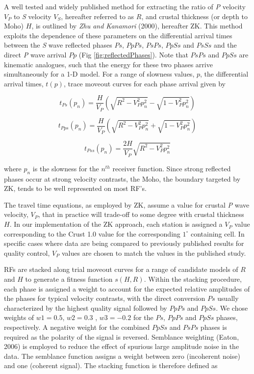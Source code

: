 \documentclass[msc,oneside]{ubcthesis}
\begin{document}
A well tested and widely published method for extracting the ratio of {\it P} velocity $V_P$ to {\it S} velocity $V_S$, hereafter referred to as $R$, and crustal thickness (or depth to Moho) $H$, is outlined by {\it Zhu and Kanamori} (2000), hereafter ZK. This method exploits the dependence of these parameters on the differential arrival times between the {\it S} wave reflected phases $Ps$, $PpPs$, $PsPs$, $PpSs$ and $PsSs$ and the direct {\it P} wave arrival $Pp$ (Fig \ref{fig:reflectedPhases}). Note that $PsPs$ and $PpSs$ are kinematic analogues, such that the energy for these two phases arrive simultaneously for a 1-D model. For a range of slowness values, $p$, the differential arrival times, $t(p)$, trace moveout curves for each phase arrival given by

\begin{equation} \label{eq:tps}
t_{Ps}(p_n) = \frac{H}{V_P} \left( \sqrt{ R^2 - V_P^2p_n^2} - \sqrt{1 - V_P^2p_n^2} \right)
\end{equation}

\begin{equation} \label{eq:tpps}
t_{Pps}(p_n) = \frac{H}{V_P} \left( \sqrt{ R^2 - V_P^2p_n^2} + \sqrt{1 - V_P^2p_n^2} \right)
\end{equation}

\begin{equation} \label{eq:tpss}
t_{Pss}(p_n)= \frac{2H}{V_P} \sqrt{ R^2 - V_P^2p_n^2}
\end{equation}

\noindent where $p_n$ is the slowness for the $n^{th}$ receiver function. Since strong reflected phases occur at strong velocity contrasts, the Moho, the boundary targeted by ZK, tends to be well represented on most RF's.

The travel time equations, as employed by ZK, assume a value for crustal {\it P} wave velocity, $V_P$, that in practice will trade-off to some degree with crustal thickness $H$. In our implementation of the ZK approach, each station is assigned a $V_P$ value corresponding to the Crust 1.0 value for the corresponding $1^\circ$ containing cell. In specific cases where data are being compared to previously published results for quality control, $V_P$  values are chosen to match the values in the published study.

RFs are stacked along trial moveout curves for a range of candidate models of $R$ and $H$ to generate a fitness function $s(H,R)$.  Within the stacking procedure, each phase is assigned a weight to account for the expected relative amplitudes of the phases for typical velocity contrasts, with the direct conversion $Ps$ usually characterized by the highest quality signal followed by $PpPs$ and $PpSs$. We chose weights of $w1 = 0.5$, $w2 = 0.3$ , $w3 = -0.2$ for the $Ps$, $PpPs$ and $PpSs$ phases, respectively. A negative weight for the combined $PpSs$ and $PsPs$ phases is required as the polarity of the signal is reversed. Semblance weighting (Eaton, 2006) is employed to reduce the effect of spurious large amplitude noise in the data. The semblance function assigns a weight between zero (incoherent noise) and one (coherent signal). The stacking function is therefore defined as
\end{document}

